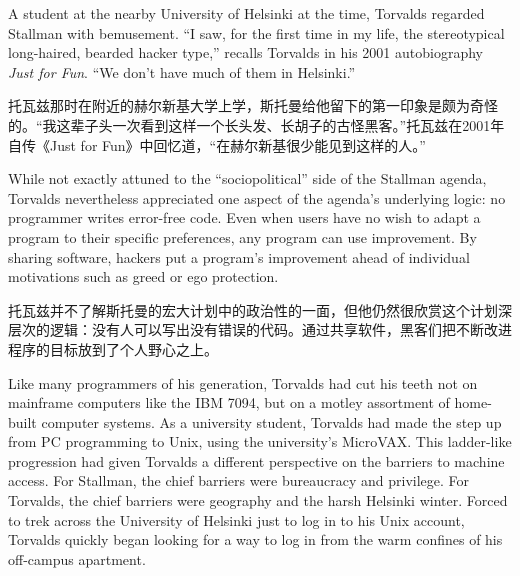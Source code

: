 \ifdefined\eng
A student at the nearby University of Helsinki at the time, Torvalds regarded Stallman with bemusement. ``I saw, for the first time in my life, the stereotypical long-haired, bearded hacker type,'' recalls Torvalds in his 2001 autobiography \textit{Just for Fun}. ``We don't have much of them in Helsinki.''
\fi

\ifdefined\chs
托瓦兹那时在附近的赫尔新基大学上学，斯托曼给他留下的第一印象是颇为奇怪的。``我这辈子头一次看到这样一个长头发、长胡子的古怪黑客。''托瓦兹在2001年自传《Just for Fun》中回忆道，``在赫尔新基很少能见到这样的人。''
\fi

\ifdefined\eng
While not exactly attuned to the ``sociopolitical'' side of the Stallman agenda, Torvalds nevertheless appreciated one aspect of the agenda's underlying logic: no programmer writes error-free code. Even when users have no wish to adapt a program to their specific preferences, any program can use improvement. By sharing software, hackers put a program's improvement ahead of individual motivations such as greed or ego protection.
\fi

\ifdefined\chs
托瓦兹并不了解斯托曼的宏大计划中的政治性的一面，但他仍然很欣赏这个计划深层次的逻辑：没有人可以写出没有错误的代码。通过共享软件，黑客们把不断改进程序的目标放到了个人野心之上。
\fi

\ifdefined\eng
Like many programmers of his generation, Torvalds had cut his teeth not on mainframe computers like the IBM 7094, but on a motley assortment of home-built computer systems. As a university student, Torvalds had made the step up from PC programming to Unix, using the university's MicroVAX. This ladder-like progression had given Torvalds a different perspective on the barriers to machine access. For Stallman, the chief barriers were bureaucracy and privilege. For Torvalds, the chief barriers were geography and the harsh Helsinki winter. Forced to trek across the University of Helsinki just to log in to his Unix account, Torvalds quickly began looking for a way to log in from the warm confines of his off-campus apartment.
\fi

